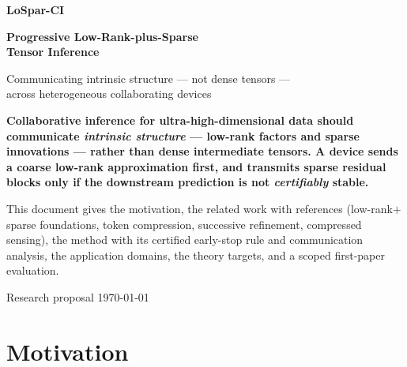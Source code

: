 \documentclass[11pt]{article}
\begin{document}
\begin{titlepage}
\centering
\vspace*{1.7cm}
{\Huge\bfseries\color{accent} LoSpar-CI\par}
\vspace{0.4cm}
{\Large\bfseries\color{accent} Progressive Low-Rank-plus-Sparse\\ Tensor Inference\par}
\vspace{0.5cm}
{\large Communicating intrinsic structure --- not dense tensors ---\\ across heterogeneous collaborating devices\par}
\vspace{1.5cm}
\begin{tcolorbox}[colback=accent3!8,colframe=accent3,width=0.92\textwidth,arc=3pt]
\centering\bfseries
Collaborative inference for ultra-high-dimensional data should communicate \emph{intrinsic
structure} --- low-rank factors and sparse innovations --- rather than dense intermediate
tensors. A device sends a coarse low-rank approximation first, and transmits sparse residual
blocks only if the downstream prediction is not \emph{certifiably} stable.
\end{tcolorbox}
\vspace{1.1cm}
\begin{tcolorbox}[colback=softgray,colframe=accent,width=0.92\textwidth,arc=3pt]
\centering
This document gives the motivation, the related work with references (low-rank$+$sparse
foundations, token compression, successive refinement, compressed sensing), the method with
its certified early-stop rule and communication analysis, the application domains, the theory
targets, and a scoped first-paper evaluation.
\end{tcolorbox}
\vfill
{\normalsize Research proposal \;\textbullet\; \today\par}
\end{titlepage}

\tableofcontents
\newpage

\section{Motivation}
\end{document}
